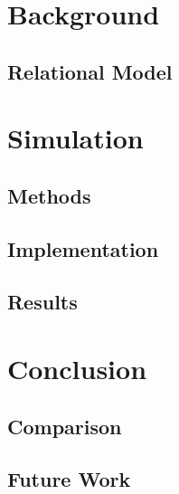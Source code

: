 \newpage
\section{Background}

\subsection{Relational Model}



\newpage

\section{Simulation}

\subsection{Methods}
\subsection{Implementation}
\subsection{Results}

\section{Conclusion}
\subsection{Comparison}
\subsection{Future Work}